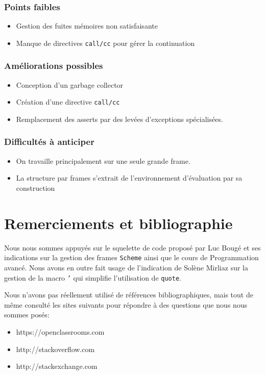 \documentclass[a4paper,11pt]{article}
\begin{document}
\subsubsection*{Points faibles}
\begin{itemize}
\item Gestion des fuites mémoires non satisfaisante
\item Manque de directives \texttt{call/cc} pour gérer la continuation
\end{itemize}

\subsubsection*{Améliorations possibles}
\begin{itemize}
\item Conception d'un garbage collector
\item Création d'une directive \texttt{call/cc}
\item Remplacement des asserts par des levées d'exceptions spécialisées.
\end{itemize}

\subsubsection*{Difficultés à anticiper}
\begin{itemize}
\item On travaille principalement sur une seule grande frame.
\item La structure par frames s'extrait de l'environnement d'évaluation par sa construction
\end{itemize}

\section{Remerciements et bibliographie}

Nous nous sommes appuyés sur le squelette de code proposé par Luc Bougé et ses
indications sur la gestion des frames \texttt{Scheme} ainsi que le cours de
Programmation avancé. Nous avons en outre fait
usage de l'indication de Solène Mirliaz sur la gestion de la macro \texttt{'} qui simplifie
l'utilisation de
\texttt{quote}.

Nous n'avons pas réellement utilisé de références bibliographiques, mais tout de
même consulté les sites suivants pour répondre à des questions que nous nous
sommes posés:
\begin{itemize}
\item https://openclassrooms.com
\item http://stackoverflow.com
\item http://stackexchange.com
\end{itemize}
\end{document}
